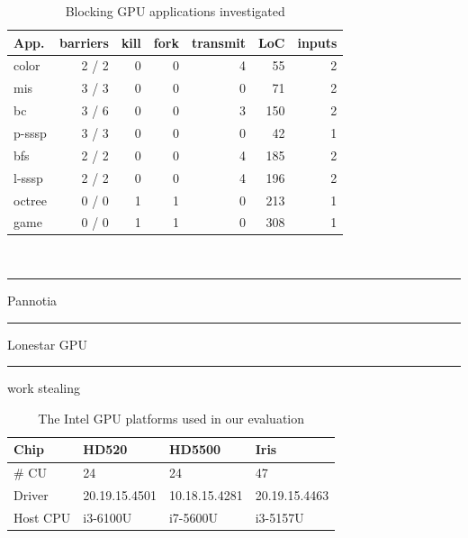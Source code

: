 \documentclass[numbers,nocopyrightspace,10pt]{sigplanconf}
\newcommand\crule[3][black]{\textcolor{#1}{\rule{#2}{#3}}}
\begin{document}
\begin{table}[t]
\small
\centering
\begin{tabular}{ l r r r r r r}
App. & barriers & kill & fork & transmit & LoC & inputs\\
\hline
\rowcolor{Gray1}
color & 2 / 2 & 0 & 0 & 4 & 55 & 2\\
\rowcolor{Gray1}
mis & 3 / 3 & 0 & 0 & 0 & 71 & 2\\
\rowcolor{Gray1}
bc & 3 / 6 & 0 & 0 & 3 & 150 & 2\\
\rowcolor{Gray1}
p-sssp & 3 / 3 & 0 & 0 & 0  & 42 & 1\\
\rowcolor{Gray2}
bfs & 2 / 2 & 0 & 0  & 4  & 185 & 2\\
\rowcolor{Gray2}
l-sssp & 2 / 2 & 0 & 0  & 4  & 196 & 2\\
\rowcolor{Gray3}
octree & 0 / 0 & 1 & 1 & 0 & 213 & 1 \\
\rowcolor{Gray3}
game & 0 / 0 & 1 & 1 & 0 & 308 & 1 \\
\end{tabular} \\
\vspace{.2cm}
\crule[Gray1]{.2cm}{.2cm} Pannotia \hspace{.4cm} \crule[Gray2]{.2cm}{.2cm} Lonestar GPU  \hspace{.4cm}  \crule[Gray3]{.2cm}{.2cm} work stealing
\caption{Blocking GPU applications investigated}
\label{tab:applications}
\end{table}

\begin{table}[h]
\footnotesize
\centering
\begin{tabular}{ l l l l }
Chip & HD520 & HD5500 & Iris\\
\hline
\# CU  & 24 & 24 & 47 \\
Driver   & 20.19.15.4501 & 10.18.15.4281 & 20.19.15.4463 \\
Host CPU & i3-6100U & i7-5600U & i3-5157U \\
\end{tabular}
\caption{The Intel GPU platforms used in our evaluation}
\label{tab:chipstested}
\end{table}
\end{document}
